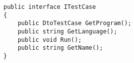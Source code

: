 

\begin{lstlisting}[caption=The interface used to implement the test cases, label={lst:test_case}]
public interface ITestCase
{
    public DtoTestCase GetProgram();
    public string GetLanguage();
    public void Run();
    public string GetName();
}
\end{lstlisting}